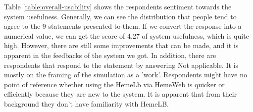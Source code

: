 Table \ref{table:overall-usability} shows the respondents sentiment towards the system usefulness. Generally, we can see the distribution that people tend to agree to the 9 statements presented to them. If we convert the response into a numerical value, we can get the score of 4.27 of system usefulness, which is quite high. However, there are still some improvements that can be made, and it is apparent in the feedbacks of the system we got. In addition, there are respondents that respond to the statement by answering Not applicable. It is mostly on the framing of the simulation as a 'work'. Respondents might have no point of reference whether using the HemeLb via HemeWeb is quicker or efficiently because they are new to the system. It is apparent that from their background they don't  have familiarity with HemeLB.



